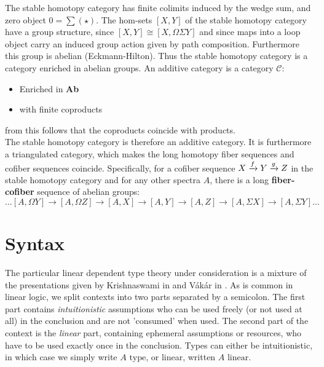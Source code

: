 The stable homotopy category has finite colimits induced by the wedge sum, and zero object $0=\sum(\star)$. The hom-sets $[X, Y]$ of the stable homotopy category have a group structure, since $[X, Y] \cong [X, \Omega \Sigma Y]$ and since maps into a loop object carry an induced group action given by path composition. Furthermore this group is abelian (Eckmann-Hilton). Thus the stable homotopy category is a category enriched in abelian groups.
An additive category is a category $\mathcal{C}$:
\begin{itemize}
\item Enriched in \textbf{Ab}
\item with finite coproducts
\end{itemize}
from this follows that the coproducts coincide with products.\\
The stable homotopy category is therefore an additive category.
It is furthermore a triangulated category, which makes the long homotopy fiber sequences and cofiber sequences coincide. Specifically, for a cofiber sequence $X \xrightarrow{f} Y \xrightarrow{g} Z$ in the stable homotopy category and for any other spectra $A$, there is a long \textbf{fiber-cofiber} sequence of abelian groups:
\[
\dots [A, \Omega Y] \to [A, \Omega Z] \to [A, X] \to [A, Y] \to [A, Z] \to [A, \Sigma X] \to [A, \Sigma Y] \dots
\]
\newpage

\section{Syntax}
The particular linear dependent type theory under consideration is a mixture of the presentations given by Krishnaswami in \cite{krishnaswami} and Vákár in \cite{vakar14}. As is common in linear logic, we split contexts into two parts separated by a semicolon. The first part contains \textit{intuitionistic} assumptions who can be used freely (or not used at all) in the conclusion and are not 'consumed' when used. The second part of the context is the \textit{linear} part, containing ephemeral assumptions or resources, who have to be used exactly once in the conclusion. Types can either be intuitionistic, in which case we simply write $A \text{ type}$, or linear, written $A \text{ linear}$. 
